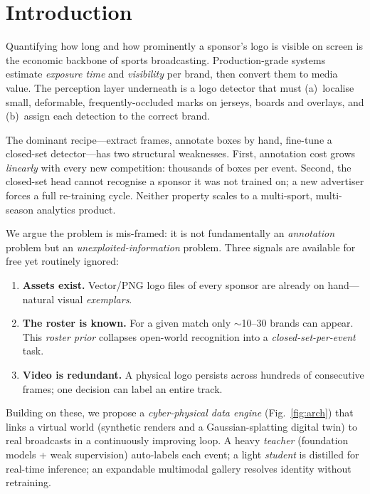 \documentclass[conference]{IEEEtran}
\begin{document}
\section{Introduction}
Quantifying how long and how prominently a sponsor's logo is visible on screen is
the economic backbone of sports broadcasting. Production-grade systems estimate
\emph{exposure time} and \emph{visibility} per brand, then convert them to media
value. The perception layer underneath is a logo detector that must (a)~localise
small, deformable, frequently-occluded marks on jerseys, boards and overlays,
and (b)~assign each detection to the correct brand.

The dominant recipe---extract frames, annotate boxes by hand, fine-tune a
closed-set detector---has two structural weaknesses. First, annotation cost grows
\emph{linearly} with every new competition: thousands of boxes per event.
Second, the closed-set head cannot recognise a sponsor it was not trained on; a
new advertiser forces a full re-training cycle. Neither property scales to a
multi-sport, multi-season analytics product.

We argue the problem is mis-framed: it is not fundamentally an
\emph{annotation} problem but an \emph{unexploited-information} problem. Three
signals are available for free yet routinely ignored:
\begin{enumerate}
  \item \textbf{Assets exist.} Vector/PNG logo files of every sponsor are already
  on hand---natural visual \emph{exemplars}.
  \item \textbf{The roster is known.} For a given match only $\sim$10--30 brands
  can appear. This \emph{roster prior} collapses open-world recognition into a
  \emph{closed-set-per-event} task.
  \item \textbf{Video is redundant.} A physical logo persists across hundreds of
  consecutive frames; one decision can label an entire track.
\end{enumerate}

Building on these, we propose a \emph{cyber-physical data engine}
(Fig.~\ref{fig:arch}) that links a virtual world (synthetic renders and a
Gaussian-splatting digital twin) to real broadcasts in a continuously improving
loop. A heavy \emph{teacher} (foundation models + weak supervision) auto-labels
each event; a light \emph{student} is distilled for real-time inference; an
expandable multimodal gallery resolves identity without retraining.
\end{document}
